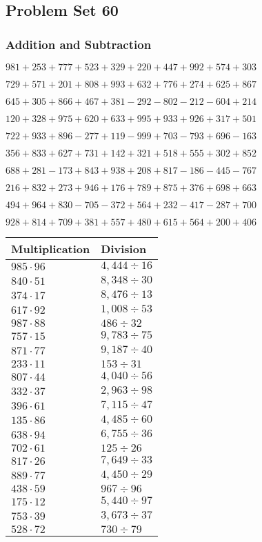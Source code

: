 \hypertarget{problem-set-60-1}{%
\subsection{Problem Set 60}\label{problem-set-60-1}}

\hypertarget{addition-and-subtraction-160}{%
\subsubsection{Addition and
Subtraction}\label{addition-and-subtraction-160}}

\(981 + 253 + 777 + 523 + 329 + 220 + 447 + 992 + 574 + 303\)

\(729 + 571 + 201 + 808 + 993 + 632 + 776 + 274 + 625 + 867\)

\(645 + 305 + 866 + 467 + 381 - 292 - 802 - 212 - 604 + 214\)

\(120 + 328 + 975 + 620 + 633 + 995 + 933 + 926 + 317 + 501\)

\(722 + 933 + 896 - 277 + 119 - 999 + 703 - 793 + 696 - 163\)

\(356 + 833 + 627 + 731 + 142 + 321 + 518 + 555 + 302 + 852\)

\(688 + 281 - 173 + 843 + 938 + 208 + 817 - 186 - 445 - 767\)

\(216 + 832 + 273 + 946 + 176 + 789 + 875 + 376 + 698 + 663\)

\(494 + 964 + 830 - 705 - 372 + 564 + 232 - 417 - 287 + 700\)

\(928 + 814 + 709 + 381 + 557 + 480 + 615 + 564 + 200 + 406\)

\begin{longtable}[]{@{}ll@{}}
\toprule
Multiplication & Division\tabularnewline
\midrule
\endhead
\(985 \cdot 96\) & \(4,444÷16\)\tabularnewline
\(840 \cdot 51\) & \(8,348÷30\)\tabularnewline
\(374 \cdot 17\) & \(8,476÷13\)\tabularnewline
\(617 \cdot 92\) & \(1,008÷53\)\tabularnewline
\(987 \cdot 88\) & \(486÷32\)\tabularnewline
\(757 \cdot 15\) & \(9,783÷75\)\tabularnewline
\(871 \cdot 77\) & \(9,187÷40\)\tabularnewline
\(233 \cdot 11\) & \(153÷31\)\tabularnewline
\(807 \cdot 44\) & \(4,040÷56\)\tabularnewline
\(332 \cdot 37\) & \(2,963÷98\)\tabularnewline
\(396 \cdot 61\) & \(7,115÷47\)\tabularnewline
\(135 \cdot 86\) & \(4,485÷60\)\tabularnewline
\(638 \cdot 94\) & \(6,755÷36\)\tabularnewline
\(702 \cdot 61\) & \(125÷26\)\tabularnewline
\(817 \cdot 26\) & \(7,649÷33\)\tabularnewline
\(889 \cdot 77\) & \(4,450÷29\)\tabularnewline
\(438 \cdot 59\) & \(967÷96\)\tabularnewline
\(175 \cdot 12\) & \(5,440÷97\)\tabularnewline
\(753 \cdot 39\) & \(3,673÷37\)\tabularnewline
\(528 \cdot 72\) & \(730÷79\)\tabularnewline
\bottomrule
\end{longtable}


